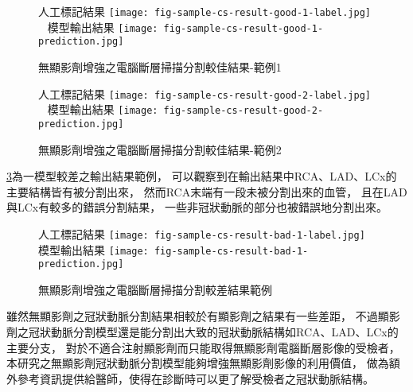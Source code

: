 \documentclass[class=NCU_thesis, crop=false]{standalone}
\begin{document}
\begin{figure}[!hbt]
    \centering
    \subcaptionbox
        {人工標記結果
        \label{fig:fig-sample-cs-result-good-1-label}}
        {\texttt{[image: fig-sample-cs-result-good-1-label.jpg]}}
    ~
    \subcaptionbox
        {模型輸出結果
        \label{fig:fig-sample-cs-result-good-1-prediction}}
        {\texttt{[image: fig-sample-cs-result-good-1-prediction.jpg]}}
    \caption{無顯影劑增強之電腦斷層掃描分割較佳結果-範例1}
    \label{fig:fig-sample-cs-result-good-1}
\end{figure}

\begin{figure}[!hbt]
    \centering
    \subcaptionbox
        {人工標記結果
        \label{fig:fig-sample-cs-result-good-1-label}}
        {\texttt{[image: fig-sample-cs-result-good-2-label.jpg]}}
    ~
    \subcaptionbox
        {模型輸出結果
        \label{fig:fig-sample-cs-result-good-1-prediction}}
        {\texttt{[image: fig-sample-cs-result-good-2-prediction.jpg]}}
    \caption{無顯影劑增強之電腦斷層掃描分割較佳結果-範例2}
    \label{fig:fig-sample-cs-result-good-2}
\end{figure}

\cref{fig:fig-sample-cs-result-bad-1}為一模型較差之輸出結果範例，
可以觀察到在輸出結果中RCA、LAD、LCx的主要結構皆有被分割出來，
然而RCA末端有一段未被分割出來的血管，
且在LAD與LCx有較多的錯誤分割結果，
一些非冠狀動脈的部分也被錯誤地分割出來。

\begin{figure}[!hbt]
    \centering
    \subcaptionbox
        {人工標記結果
        \label{fig:fig-sample-cs-result-bad-1-label}}
        {\texttt{[image: fig-sample-cs-result-bad-1-label.jpg]}}
    ~
    \subcaptionbox
        {模型輸出結果
        \label{fig:fig-sample-cs-result-bad-1-prediction}}
        {\texttt{[image: fig-sample-cs-result-bad-1-prediction.jpg]}}
    \caption{無顯影劑增強之電腦斷層掃描分割較差結果範例}
    \label{fig:fig-sample-cs-result-bad-1}
\end{figure}

雖然無顯影劑之冠狀動脈分割結果相較於有顯影劑之結果有一些差距，
不過顯影劑之冠狀動脈分割模型還是能分割出大致的冠狀動脈結構如RCA、LAD、LCx的主要分支，
對於不適合注射顯影劑而只能取得無顯影劑電腦斷層影像的受檢者，
本研究之無顯影劑冠狀動脈分割模型能夠增強無顯影劑影像的利用價值，
做為額外參考資訊提供給醫師，使得在診斷時可以更了解受檢者之冠狀動脈結構。
\end{document}
